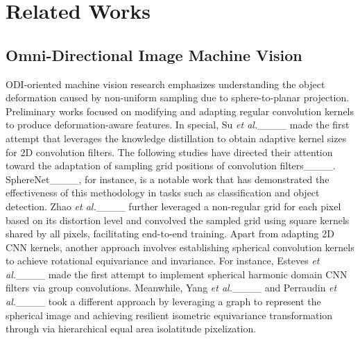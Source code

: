 \section{Related Works}
\label{sec_background}
\subsection{Omni-Directional Image Machine Vision}
ODI-oriented machine vision research emphasizes understanding the object deformation caused by non-uniform sampling due to sphere-to-planar projection.
%
Preliminary works focused on modifying and adapting regular convolution kernels to produce deformation-aware features.
%
In special, Su \textit{et al.}____ made the first attempt that leverages the knowledge distillation to obtain adaptive kernel sizes for 2D convolution filters.
%
%
%
The following studies have directed their attention toward the adaptation of sampling grid positions of convolution filters____.
%
SphereNet____, for instance, is a notable work that has demonstrated the effectiveness of this methodology in tasks such as classification and object detection.
%
Zhao \textit{et al.}____ further leveraged a non-regular grid for each pixel based on its distortion level and convolved the sampled grid using square kernels shared by all pixels, facilitating end-to-end training.
%
Apart from adapting 2D CNN kernels, another approach involves establishing spherical convolution kernels to achieve rotational equivariance and invariance.
%
For instance, Esteves \textit{et al.}____ made the first attempt to implement spherical harmonic domain CNN filters via group convolutions.
Meanwhile, Yang \textit{et al.}____ and Perraudin \textit{et al.}____ took a different approach by leveraging a graph to represent the spherical image and achieving resilient isometric equivariance transformation through via hierarchical equal area isolatitude pixelization.

%
